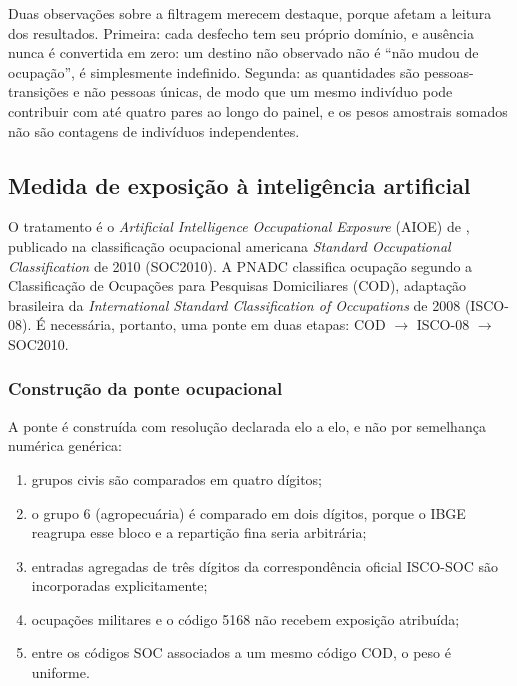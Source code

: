 \begin{figure}[htbp]
\end{figure}

Duas observações sobre a filtragem merecem destaque, porque afetam a leitura
dos resultados. Primeira: cada desfecho tem seu próprio domínio, e ausência
nunca é convertida em zero: um destino não observado não é ``não mudou de
ocupação'', é simplesmente indefinido. Segunda: as quantidades são
pessoas-transições e não pessoas únicas, de modo que um mesmo indivíduo pode
contribuir com até quatro pares ao longo do painel, e os pesos amostrais somados
não são contagens de indivíduos independentes.

\subsection{Medida de exposição à inteligência artificial}
\label{sec:exposicao}

O tratamento é o \textit{Artificial Intelligence Occupational Exposure} (AIOE)
de , publicado na classificação ocupacional americana
\textit{Standard Occupational Classification} de 2010 (SOC2010). A PNADC
classifica ocupação segundo a Classificação de Ocupações para Pesquisas
Domiciliares (COD), adaptação brasileira da \textit{International Standard
Classification of Occupations} de 2008 (ISCO-08). É necessária, portanto, uma
ponte em duas etapas: COD $\rightarrow$ ISCO-08 $\rightarrow$ SOC2010.

\subsubsection{Construção da ponte ocupacional}

A ponte é construída com resolução declarada elo a elo, e não por semelhança
numérica genérica:

\begin{enumerate}[label=\alph*)]
  \item grupos civis são comparados em quatro dígitos;
  \item o grupo 6 (agropecuária) é comparado em dois dígitos, porque o IBGE
        reagrupa esse bloco e a repartição fina seria arbitrária;
  \item entradas agregadas de três dígitos da correspondência oficial
        ISCO-SOC são incorporadas explicitamente;
  \item ocupações militares e o código 5168 não recebem exposição atribuída;
  \item entre os códigos SOC associados a um mesmo código COD, o peso é
        uniforme.
\end{enumerate}

